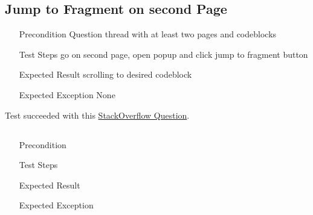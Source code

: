 \documentclass{report}
\begin{document}
\subsection*{Jump to Fragment on second Page}
\begin{itemize}
	\item[Precondition] Question thread with at least two pages and codeblocks
	\item[Test Steps] go on second page, open popup and click jump to fragment button
	\item[Expected Result] scrolling to desired codeblock
	\item[Expected Exception] None
\end{itemize}
Test succeeded with this \href{https://stackoverflow.com/questions/221294/how-do-you-get-a-timestamp-in-javascript?page=2}{StackOverflow Question}. 

\subsection*{}
\begin{itemize}
	\item[Precondition]
	\item[Test Steps]
	\item[Expected Result]
	\item[Expected Exception]
\end{itemize}
\end{document}
